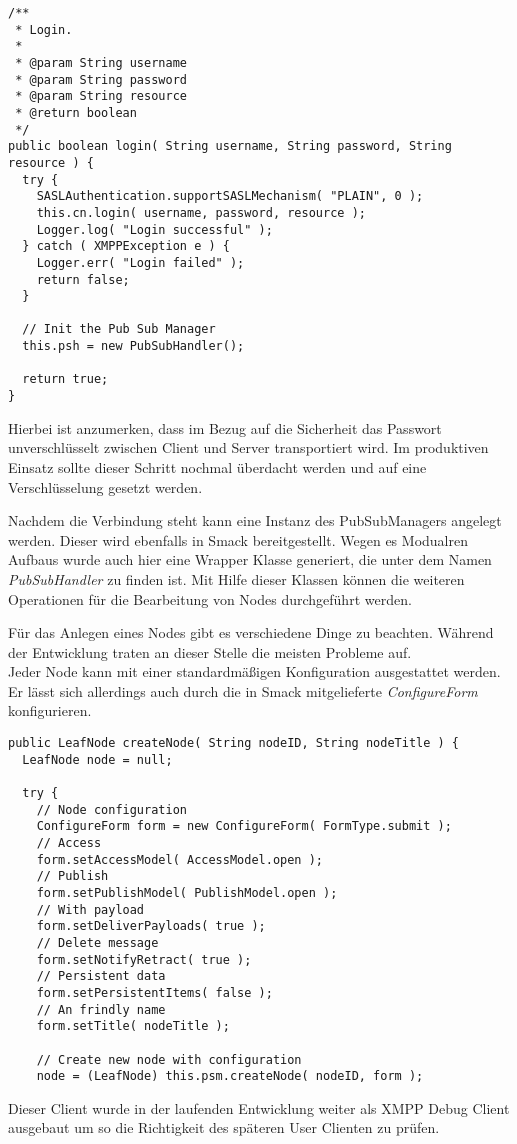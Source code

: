 \begin{lstlisting}[label=xmpplogin,caption=Auszug aus ConnectionHandler für den Login]
/**
 * Login.
 *
 * @param String username
 * @param String password
 * @param String resource
 * @return boolean
 */
public boolean login( String username, String password, String resource ) {
  try {
    SASLAuthentication.supportSASLMechanism( "PLAIN", 0 );
    this.cn.login( username, password, resource );
    Logger.log( "Login successful" );
  } catch ( XMPPException e ) {
    Logger.err( "Login failed" );
    return false;
  }

  // Init the Pub Sub Manager
  this.psh = new PubSubHandler();

  return true;
}
\end{lstlisting}

Hierbei ist anzumerken, dass im Bezug auf die Sicherheit das Passwort unverschlüsselt zwischen Client und Server transportiert wird. Im produktiven Einsatz sollte dieser Schritt nochmal überdacht werden und auf eine Verschlüsselung gesetzt werden.

\vspace{0.2cm}

Nachdem die Verbindung steht kann eine Instanz des PubSubManagers angelegt werden. Dieser wird ebenfalls in Smack bereitgestellt. Wegen es Modualren Aufbaus wurde auch hier eine Wrapper Klasse generiert, die unter dem Namen \textit{PubSubHandler} zu finden ist. Mit Hilfe dieser Klassen können die weiteren Operationen für die Bearbeitung von Nodes durchgeführt werden.

\vspace{0.2cm}

Für das Anlegen eines Nodes gibt es verschiedene Dinge zu beachten. Während der Entwicklung traten an dieser Stelle die meisten Probleme auf.\\

Jeder Node kann mit einer standardmäßigen Konfiguration ausgestattet werden. Er lässt sich allerdings auch durch die in Smack mitgelieferte  \textit{ConfigureForm} konfigurieren.

\begin{lstlisting}[label=xmppnodecreate,caption=Auszug aus PubSubHandler.createNode() für das Anlegen eines Nodes]
public LeafNode createNode( String nodeID, String nodeTitle ) {
  LeafNode node = null;

  try {
    // Node configuration
    ConfigureForm form = new ConfigureForm( FormType.submit );
    // Access
    form.setAccessModel( AccessModel.open );
    // Publish
    form.setPublishModel( PublishModel.open );
    // With payload
    form.setDeliverPayloads( true );
    // Delete message
    form.setNotifyRetract( true );
    // Persistent data
    form.setPersistentItems( false );
    // An frindly name
    form.setTitle( nodeTitle );

    // Create new node with configuration
    node = (LeafNode) this.psm.createNode( nodeID, form );
\end{lstlisting}

\vspace{0.2cm}

\vspace{0.2cm}


Dieser Client wurde in der laufenden Entwicklung weiter als XMPP Debug Client ausgebaut um so die Richtigkeit des späteren User Clienten zu prüfen.
